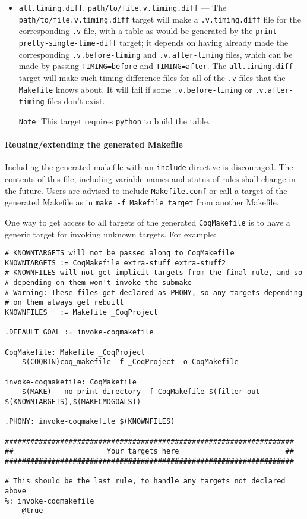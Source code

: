 \begin{itemize}
\item \texttt{all.timing.diff}, \texttt{path/to/file.v.timing.diff}
  --- The \texttt{path/to/file.v.timing.diff} target will make a
  \texttt{.v.timing.diff} file for the corresponding \texttt{.v} file,
  with a table as would be generated by the
  \texttt{print-pretty-single-time-diff} target; it depends on having
  already made the corresponding \texttt{.v.before-timing} and
  \texttt{.v.after-timing} files, which can be made by passing
  \texttt{TIMING=before} and \texttt{TIMING=after}.  The
  \texttt{all.timing.diff} target will make such timing difference
  files for all of the \texttt{.v} files that the \texttt{Makefile}
  knows about.  It will fail if some \texttt{.v.before-timing} or
  \texttt{.v.after-timing} files don't exist.

  \texttt{Note}: This target requires \texttt{python} to build the table.
\end{itemize}

\paragraph{Reusing/extending the generated Makefile} %

Including the generated makefile with an {\tt include} directive is discouraged.
The contents of this file, including variable names
and status of rules shall change in the future.  Users are advised to
include {\tt Makefile.conf} or call a target of the generated Makefile
as in {\tt make -f Makefile target} from another Makefile.

One way to get access to all targets of the generated
\texttt{CoqMakefile} is to have a generic target for invoking unknown
targets.  For example:
\begin{verbatim}
# KNOWNTARGETS will not be passed along to CoqMakefile
KNOWNTARGETS := CoqMakefile extra-stuff extra-stuff2
# KNOWNFILES will not get implicit targets from the final rule, and so
# depending on them won't invoke the submake
# Warning: These files get declared as PHONY, so any targets depending
# on them always get rebuilt
KNOWNFILES   := Makefile _CoqProject

.DEFAULT_GOAL := invoke-coqmakefile

CoqMakefile: Makefile _CoqProject
	$(COQBIN)coq_makefile -f _CoqProject -o CoqMakefile

invoke-coqmakefile: CoqMakefile
	$(MAKE) --no-print-directory -f CoqMakefile $(filter-out $(KNOWNTARGETS),$(MAKECMDGOALS))

.PHONY: invoke-coqmakefile $(KNOWNFILES)

####################################################################
##                      Your targets here                         ##
####################################################################

# This should be the last rule, to handle any targets not declared above
%: invoke-coqmakefile
	@true
\end{verbatim}


